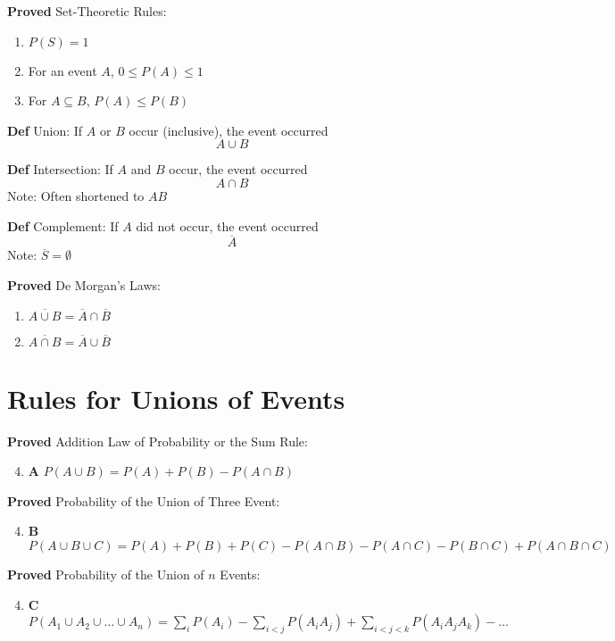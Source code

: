 \documentclass[11pt,notitlepage]{report}
\begin{document}
\textbf{Proved} Set-Theoretic Rules:
\begin{enumerate}
    \item $P(S) = 1$
    \item For an event $A$, $0 \leq P(A) \leq 1$
    \item For $A \subseteq B$, $P(A) \leq P(B)$
\end{enumerate}

\textbf{Def} Union: If $A$ or $B$ occur (inclusive), the event occurred
$$A \cup B$$

\textbf{Def} Intersection: If $A$ and $B$ occur, the event occurred
$$A \cap B$$
\hspace*{5mm} Note: Often shortened to $AB$

\textbf{Def} Complement: If $A$ did not occur, the event occurred
$$\overline A$$
\hspace*{5mm} Note: $\overline S = \emptyset$

\textbf{Proved} De Morgan's Laws: \begin{enumerate}
    \item $\overline{A \cup B} = \overline A \cap \overline B$
    \item $\overline{A \cap B} = \overline A \cup \overline B$
\end{enumerate}
\newpage
\section{Rules for Unions of Events}

\textbf{Proved} Addition Law of Probability or the Sum Rule: \begin{enumerate}
    \setcounter{enumi}{3}
    \item \textbf A $P(A \cup B) = P(A) + P(B) - P(A \cap B)$
\end{enumerate}
\textbf{Proved} Probability of the Union of Three Event: \begin{enumerate}
    \setcounter{enumi}{3}
    \item \textbf B $P(A \cup B \cup C) = P(A) + P(B) + P(C) - P(A \cap B) - P(A \cap C) - P(B \cap C) + P(A \cap B \cap C)$
\end{enumerate}
\textbf{Proved} Probability of the Union of $n$ Events: \begin{enumerate}
    \setcounter{enumi}{3}
    \item \textbf{C} $P(A_1 \cup A_2 \cup \dots \cup A_n) = \sum_i P (A_i) - \sum_{i < j}P(A_iA_j) + \sum_{i < j < k} P(A_iA_jA_k) - \dots$
\end{enumerate}
\end{document}
